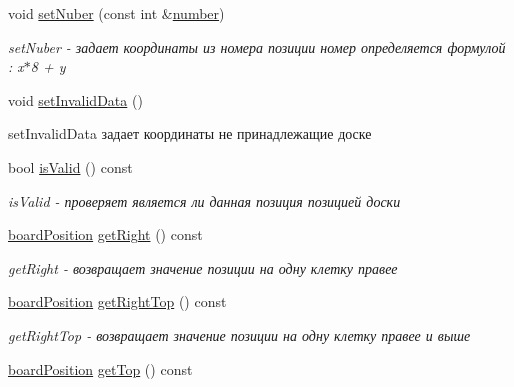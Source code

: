 \begin{DoxyCompactItemize}
void \hyperlink{classboard_position_a9e97897840e379e2206d18cf79c04d1f}{set\+Nuber} (const int \&\hyperlink{classboard_position_afb83b12885a2ec552cecb067573011d4}{number})
\begin{DoxyCompactList}\small\item\em set\+Nuber -\/ задает координаты из номера позиции номер определяется формулой \+: x$\ast$8 + y \end{DoxyCompactList}\item 
\hypertarget{classboard_position_a0b6c1e580902f8b4d7aff1477741841c}{}void \hyperlink{classboard_position_a0b6c1e580902f8b4d7aff1477741841c}{set\+Invalid\+Data} ()\label{classboard_position_a0b6c1e580902f8b4d7aff1477741841c}

\begin{DoxyCompactList}\small\item\em 
\begin{DoxyItemize}
\item set\+Invalid\+Data задает координаты не принадлежащие доске 
\end{DoxyItemize}\end{DoxyCompactList}\item 
bool \hyperlink{classboard_position_a4a404ab23f49b541ce25941d69472582}{is\+Valid} () const 
\begin{DoxyCompactList}\small\item\em is\+Valid -\/ проверяет является ли данная позиция позицией доски \end{DoxyCompactList}\item 
\hyperlink{classboard_position}{board\+Position} \hyperlink{classboard_position_a0eb1fa8e303bc9def2547cd3bb2d2ef7}{get\+Right} () const 
\begin{DoxyCompactList}\small\item\em get\+Right -\/ возвращает значение позиции на одну клетку правее \end{DoxyCompactList}\item 
\hyperlink{classboard_position}{board\+Position} \hyperlink{classboard_position_a7bd99b1681779f7af040a9da8aec659a}{get\+Right\+Top} () const 
\begin{DoxyCompactList}\small\item\em get\+Right\+Top -\/ возвращает значение позиции на одну клетку правее и выше \end{DoxyCompactList}\item 
\hyperlink{classboard_position}{board\+Position} \hyperlink{classboard_position_a4454d72951643a9ea1baf28473219927}{get\+Top} () const 

\end{DoxyCompactItemize}
